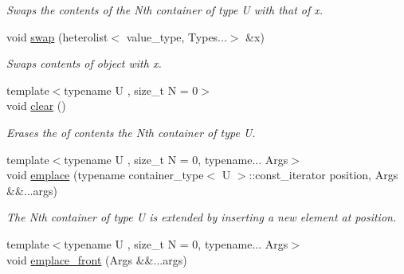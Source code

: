 \begin{DoxyCompactItemize}
\begin{DoxyCompactList}\small\item\em Swaps the contents of the Nth container of type U with that of x. \end{DoxyCompactList}\item 
\hypertarget{classheterogeneous_1_1heterolist_3_01_t_00_01_types_8_8_8_4_a69a8a48ac7c6de17d045bb972b7004a5}{}void \hyperlink{classheterogeneous_1_1heterolist_3_01_t_00_01_types_8_8_8_4_a69a8a48ac7c6de17d045bb972b7004a5}{swap} (heterolist$<$ value\+\_\+type, Types...$>$ \&x)\label{classheterogeneous_1_1heterolist_3_01_t_00_01_types_8_8_8_4_a69a8a48ac7c6de17d045bb972b7004a5}

\begin{DoxyCompactList}\small\item\em Swaps contents of object with x. \end{DoxyCompactList}\item 
\hypertarget{classheterogeneous_1_1heterolist_3_01_t_00_01_types_8_8_8_4_aae0df706b73d7a91fa8c484a3ff3b201}{}{\footnotesize template$<$typename U , size\+\_\+t N = 0$>$ }\\void \hyperlink{classheterogeneous_1_1heterolist_3_01_t_00_01_types_8_8_8_4_aae0df706b73d7a91fa8c484a3ff3b201}{clear} ()\label{classheterogeneous_1_1heterolist_3_01_t_00_01_types_8_8_8_4_aae0df706b73d7a91fa8c484a3ff3b201}

\begin{DoxyCompactList}\small\item\em Erases the of contents the Nth container of type U. \end{DoxyCompactList}\item 
\hypertarget{classheterogeneous_1_1heterolist_3_01_t_00_01_types_8_8_8_4_ab942240c48887dce811a7d5f58e0c333}{}{\footnotesize template$<$typename U , size\+\_\+t N = 0, typename... Args$>$ }\\void \hyperlink{classheterogeneous_1_1heterolist_3_01_t_00_01_types_8_8_8_4_ab942240c48887dce811a7d5f58e0c333}{emplace} (typename container\+\_\+type$<$ U $>$\+::const\+\_\+iterator position, Args \&\&...args)\label{classheterogeneous_1_1heterolist_3_01_t_00_01_types_8_8_8_4_ab942240c48887dce811a7d5f58e0c333}

\begin{DoxyCompactList}\small\item\em The Nth container of type U is extended by inserting a new element at position. \end{DoxyCompactList}\item 
\hypertarget{classheterogeneous_1_1heterolist_3_01_t_00_01_types_8_8_8_4_a19c4e417e68b34b37b0d9029b58f83cb}{}{\footnotesize template$<$typename U , size\+\_\+t N = 0, typename... Args$>$ }\\void \hyperlink{classheterogeneous_1_1heterolist_3_01_t_00_01_types_8_8_8_4_a19c4e417e68b34b37b0d9029b58f83cb}{emplace\+\_\+front} (Args \&\&...args)\label{classheterogeneous_1_1heterolist_3_01_t_00_01_types_8_8_8_4_a19c4e417e68b34b37b0d9029b58f83cb}


\end{DoxyCompactItemize}
